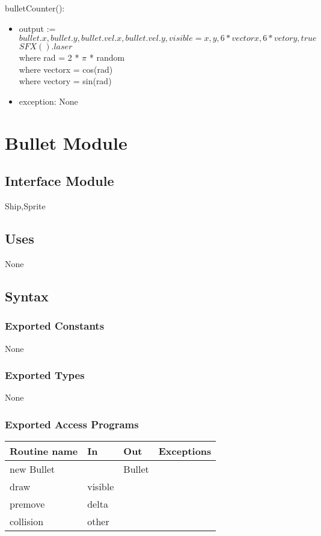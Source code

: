 \documentclass[12pt]{article}
\begin{document}
\noindent bulletCounter():
\begin{itemize}
\item output := $bullet.x, bullet.y , bullet.vel.x, bullet.vel.y, visible  = x,y,6 * vectorx , 6 * vetory, true$\\
$SFX().laser$\\
where rad = 2 * $\pi$ * random\\
where vectorx = cos(rad)\\
where vectory = sin(rad)\\
\item exception: None
\end{itemize}

\newpage

\section* {Bullet Module}

\subsection*{Interface Module}

Ship,Sprite

\subsection* {Uses}

None

\subsection* {Syntax}

\subsubsection* {Exported Constants}

None

\subsubsection* {Exported Types}

None 

\subsubsection* {Exported Access Programs}

\begin{tabular}{| l | l | l | p{5cm} |}
\hline
\textbf{Routine name} & \textbf{In} & \textbf{Out} & \textbf{Exceptions}\\
\hline
new Bullet & ~ & Bullet  & ~\\
\hline
draw & visible & ~ & ~\\
\hline
premove & delta & ~  & ~\\
\hline
collision & other & ~ & ~ \\
\hline
\end{tabular}
\end{document}
